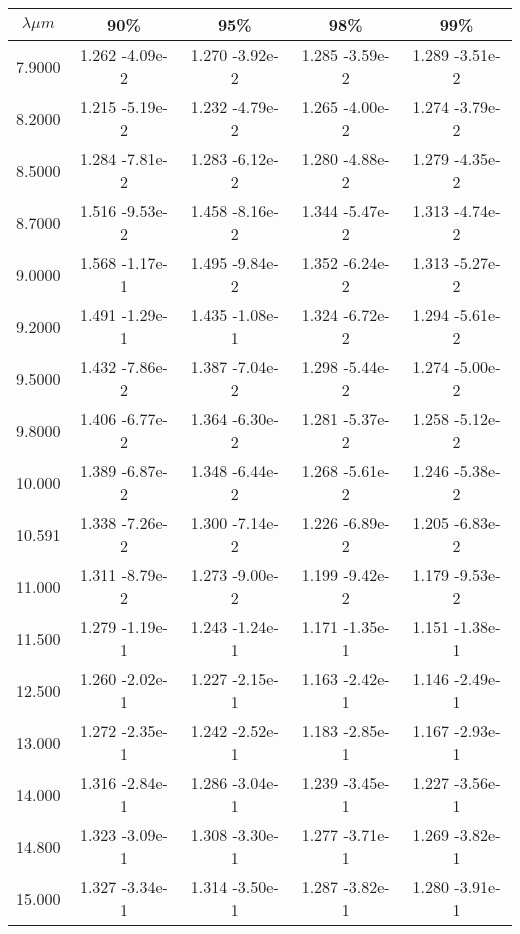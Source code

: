 \documentclass[12pt]{article}
\begin{document}
\begin{center}
\begin{table}
\begin{tabular}{| c | c | c | c | c |  }
\hline
 $\lambda \mu m$   & 90\%  & 95\%  & 98\%  & 99\% \\
\hline
7.9000 &    1.262   -4.09e-2 &   1.270   -3.92e-2  &  1.285   -3.59e-2  &  1.289   -3.51e-2  \\
8.2000 &    1.215   -5.19e-2 &   1.232   -4.79e-2  &  1.265   -4.00e-2  &  1.274   -3.79e-2  \\
8.5000 &    1.284   -7.81e-2  &  1.283   -6.12e-2 &   1.280   -4.88e-2  &  1.279   -4.35e-2  \\
8.7000 &    1.516   -9.53e-2  &  1.458   -8.16e-2 &   1.344   -5.47e-2  &  1.313   -4.74e-2  \\
9.0000 &    1.568   -1.17e-1  &  1.495   -9.84e-2 &   1.352   -6.24e-2 &   1.313   -5.27e-2  \\
9.2000 &    1.491   -1.29e-1  &  1.435   -1.08e-1 &   1.324   -6.72e-2 &   1.294   -5.61e-2  \\
9.5000 &    1.432   -7.86e-2  &  1.387   -7.04e-2 &   1.298   -5.44e-2 &   1.274   -5.00e-2  \\
9.8000 &    1.406   -6.77e-2 &   1.364   -6.30e-2 &   1.281   -5.37e-2  &  1.258   -5.12e-2  \\
10.000 &    1.389   -6.87e-2 &   1.348   -6.44e-2  &  1.268   -5.61e-2 &   1.246   -5.38e-2  \\
10.591 &    1.338   -7.26e-2 &   1.300   -7.14e-2 &   1.226   -6.89e-2  &  1.205   -6.83e-2  \\
11.000 &    1.311   -8.79e-2 &   1.273   -9.00e-2 &   1.199   -9.42e-2  &  1.179   -9.53e-2  \\
11.500 &   1.279   -1.19e-1  &  1.243   -1.24e-1  &  1.171   -1.35e-1  &  1.151   -1.38e-1  \\
12.500 &    1.260   -2.02e-1 &   1.227   -2.15e-1  &  1.163   -2.42e-1  &  1.146   -2.49e-1  \\
13.000  &   1.272   -2.35e-1 &   1.242   -2.52e-1  &  1.183   -2.85e-1  &  1.167   -2.93e-1  \\
14.000  &   1.316   -2.84e-1 &   1.286   -3.04e-1 &   1.239   -3.45e-1  &  1.227   -3.56e-1  \\
14.800  &   1.323   -3.09e-1 &   1.308   -3.30e-1  &  1.277   -3.71e-1  &  1.269   -3.82e-1  \\
15.000  &   1.327   -3.34e-1 &   1.314   -3.50e-1 &   1.287   -3.82e-1  &  1.280   -3.91e-1  \\

\end{tabular}
\end{table}
\end{center}
\end{document}
